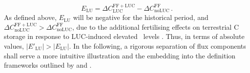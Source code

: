 \begin{equation}
E_{\text{LU}} = \Delta C^{\mathrm{FF+LUC}}_{\mathrm{LUC}} - \Delta C^{\mathrm{FF}}_{\mathrm{no LUC}}\,.
\label{eq:fluc}
\end{equation}
As defined above, $E_{\text{LU}}$ will be negative for the historical period, and $\Delta C^{\mathrm{FF+LUC}}_{\mathrm{no LUC}} > \Delta C^{\mathrm{FF}}_{\mathrm{no LUC}}$, due to the additional fertilising effects on terrestrial C storage in response to LUC-induced elevated \coo\ levels \citep{strassmann08tel}. Thus, in terms of absolute values, $|E'_{\text{LU}}|>|E_{\text{LU}}|$. In the following, a rigorous separation of flux components shall serve a more intuitive illustration and the embedding into the definition frameworks outlined by \citep{strassmann08tel} and \citet{gasserciais13}.\\

